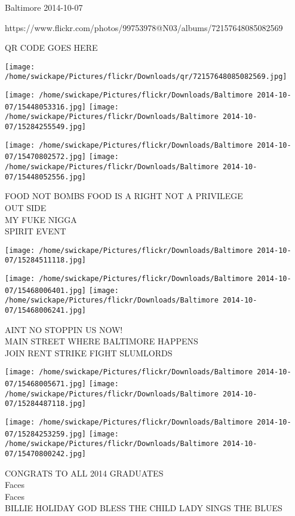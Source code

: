 \documentclass[10pt,letterpaper]{article}
\begin{document}
Baltimore 2014-10-07

https://www.flickr.com/photos/99753978@N03/albums/72157648085082569

QR CODE GOES HERE

\texttt{[image: /home/swickape/Pictures/flickr/Downloads/qr/72157648085082569.jpg]}
\pagebreak

\texttt{[image: /home/swickape/Pictures/flickr/Downloads/Baltimore 2014-10-07/15448053316.jpg]}
\texttt{[image: /home/swickape/Pictures/flickr/Downloads/Baltimore 2014-10-07/15284255549.jpg]}

\texttt{[image: /home/swickape/Pictures/flickr/Downloads/Baltimore 2014-10-07/15470802572.jpg]}
\texttt{[image: /home/swickape/Pictures/flickr/Downloads/Baltimore 2014-10-07/15448052556.jpg]}

FOOD NOT BOMBS FOOD IS A RIGHT NOT A PRIVILEGE\\
OUT SIDE\\
MY FUKE NIGGA\\
SPIRIT EVENT\\
\pagebreak

\texttt{[image: /home/swickape/Pictures/flickr/Downloads/Baltimore 2014-10-07/15284511118.jpg]}

\vspace{0.25in}
\texttt{[image: /home/swickape/Pictures/flickr/Downloads/Baltimore 2014-10-07/15468006401.jpg]}
\texttt{[image: /home/swickape/Pictures/flickr/Downloads/Baltimore 2014-10-07/15468006241.jpg]}

AINT NO STOPPIN US NOW!\\
MAIN STREET WHERE BALTIMORE HAPPENS\\
JOIN RENT STRIKE FIGHT SLUMLORDS\\
\pagebreak

\texttt{[image: /home/swickape/Pictures/flickr/Downloads/Baltimore 2014-10-07/15468005671.jpg]}
\texttt{[image: /home/swickape/Pictures/flickr/Downloads/Baltimore 2014-10-07/15284487118.jpg]}

\texttt{[image: /home/swickape/Pictures/flickr/Downloads/Baltimore 2014-10-07/15284253259.jpg]}
\texttt{[image: /home/swickape/Pictures/flickr/Downloads/Baltimore 2014-10-07/15470800242.jpg]}

CONGRATS TO ALL 2014 GRADUATES\\
Faces\\
Faces\\
BILLIE HOLIDAY GOD BLESS THE CHILD LADY SINGS THE BLUES\\
\pagebreak
\end{document}
